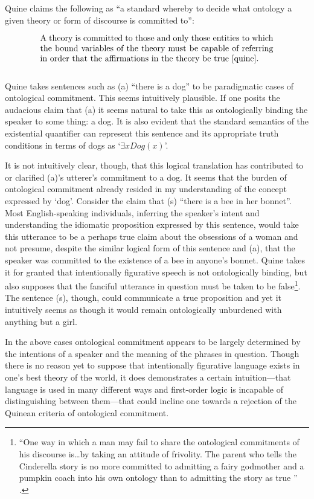 \documentclass[12pt,a4paper]{article}
\newenvironment{te}
{\begin{singlespace}
\begin{equation}
\begin{minipage}[t]{0.8\linewidth}}
{\end{minipage}
\end{equation}
\end{singlespace}
\ignorespacesafterend}
\begin{document}
Quine claims the following as ``a standard whereby to decide what
ontology a given theory or form of discourse is committed to'':
\begin{te}
A theory is committed to those and only those entities to which the
bound variables of the theory must be capable of referring in order
that the affirmations in the theory be true \cite[p.13]{quine}.\\
\label{ontcommit}
\end{te}

Quine takes sentences such as (a) ``there is a dog'' to be
paradigmatic cases of ontological commitment.  This seems intuitively
plausible.  If one posits the audacious claim that (a) it seems
natural to take this as ontologically binding the speaker to some
thing: a dog. It is also evident that the standard semantics of the
existential quantifier can represent this sentence and its appropriate
truth conditions in terms of dogs as `$\exists xDog(x)$'. 

It is not intuitively clear, though, that this logical translation has
contributed to or clarified (a)'s utterer's commitment to a dog. It
seems that the burden of ontological commitment already resided in my
understanding of the concept expressed by `dog'.  Consider the claim
that (s) ``there is a bee in her bonnet''. Most English-speaking
individuals, inferring the speaker's intent and understanding the
idiomatic proposition expressed by this sentence, would take this
utterance to be a perhaps true claim about the obsessions of a woman
and not presume, despite the similar logical form of this sentence and
(a), that the speaker was committed to the existence of a bee in
anyone's bonnet.  Quine takes it for granted that intentionally
figurative speech is not ontologically binding, but also supposes that
the fanciful utterance in question must be taken to be false\footnote{
  ``One way in which a man may fail to share the ontological
  commitments of his discourse is\ldots by taking an attitude of
  frivolity.  The parent who tells the Cinderella story is no more
  committed to admitting a fairy godmother and a pumpkin coach into
  his own ontology than to admitting the story as true ''
  \cite[p.103]{quine}.}. The sentence (s), though, could communicate a
true proposition and yet it intuitively seems as though it would
remain ontologically unburdened with anything but a girl.

In the above cases ontological commitment appears to be largely
determined by the intentions of a speaker and the meaning of the
phrases in question.  Though there is no reason yet to suppose that
intentionally figurative language exists in one's best theory of the
world, it does demonstrates a certain intuition---that language is used
in many different ways and first-order logic is incapable of
distinguishing between them---that could incline one towards a
rejection of the Quinean criteria of ontological commitment.
\end{document}

